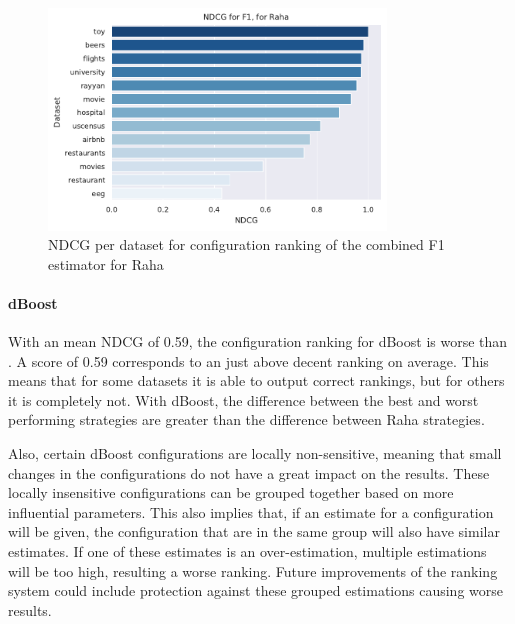\begin{figure}[H]
    \centering
    \includegraphics[width=0.8\textwidth]{thesis/Figures/RQ3/15_combined_profiler_NDCG_Raha.pdf}
    \caption{NDCG per dataset for configuration ranking of the combined F1 estimator for Raha}
    \label{fig:ndcg_per_config_Raha}
\end{figure}

\paragraph{dBoost} With an mean NDCG of 0.59, the configuration ranking for dBoost is worse than . A score of 0.59 corresponds to an just above decent ranking on average. This means that for some datasets it is able to output correct rankings, but for others it is completely not. With dBoost, the difference between the best and worst performing strategies are greater than the difference between Raha strategies. 

Also, certain dBoost configurations are locally non-sensitive, meaning that small changes in the configurations do not have a great impact on the results. These locally insensitive configurations can be grouped together based on more influential parameters. This also implies that, if an estimate for a configuration will be given, the configuration that are in the same group will also have similar estimates. If one of these estimates is an over-estimation, multiple estimations will be too high, resulting a worse ranking. Future improvements of the ranking system could include protection against these grouped estimations causing worse results.

